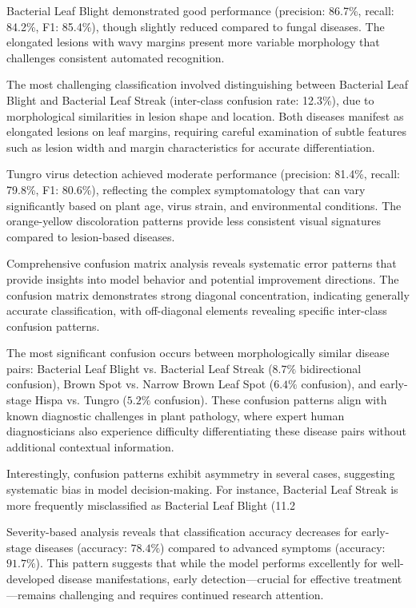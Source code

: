 \documentclass[agriculture,article,submit,pdftex,moreauthors]{Definitions/mdpi}
\begin{document}
Bacterial Leaf Blight demonstrated good performance (precision: 86.7\%, recall: 84.2\%, F1: 85.4\%), though slightly reduced compared to fungal diseases. The elongated lesions with wavy margins present more variable morphology that challenges consistent automated recognition.

The most challenging classification involved distinguishing between Bacterial Leaf Blight and Bacterial Leaf Streak (inter-class confusion rate: 12.3\%), due to morphological similarities in lesion shape and location. Both diseases manifest as elongated lesions on leaf margins, requiring careful examination of subtle features such as lesion width and margin characteristics for accurate differentiation.

Tungro virus detection achieved moderate performance (precision: 81.4\%, recall: 79.8\%, F1: 80.6\%), reflecting the complex symptomatology that can vary significantly based on plant age, virus strain, and environmental conditions. The orange-yellow discoloration patterns provide less consistent visual signatures compared to lesion-based diseases.


Comprehensive confusion matrix analysis reveals systematic error patterns that provide insights into model behavior and potential improvement directions. The confusion matrix demonstrates strong diagonal concentration, indicating generally accurate classification, with off-diagonal elements revealing specific inter-class confusion patterns.

The most significant confusion occurs between morphologically similar disease pairs: Bacterial Leaf Blight vs. Bacterial Leaf Streak ($8.7\%$ bidirectional confusion), Brown Spot vs. Narrow Brown Leaf Spot ($6.4\%$ confusion), and early-stage Hispa vs. Tungro ($5.2\%$ confusion). These confusion patterns align with known diagnostic challenges in plant pathology, where expert human diagnosticians also experience difficulty differentiating these disease pairs without additional contextual information.

Interestingly, confusion patterns exhibit asymmetry in several cases, suggesting systematic bias in model decision-making. For instance, Bacterial Leaf Streak is more frequently misclassified as Bacterial Leaf Blight (11.2%

Severity-based analysis reveals that classification accuracy decreases for early-stage diseases (accuracy: $78.4\%$) compared to advanced symptoms (accuracy: $91.7\%$). This pattern suggests that while the model performs excellently for well-developed disease manifestations, early detection—crucial for effective treatment—remains challenging and requires continued research attention.
\end{document}
